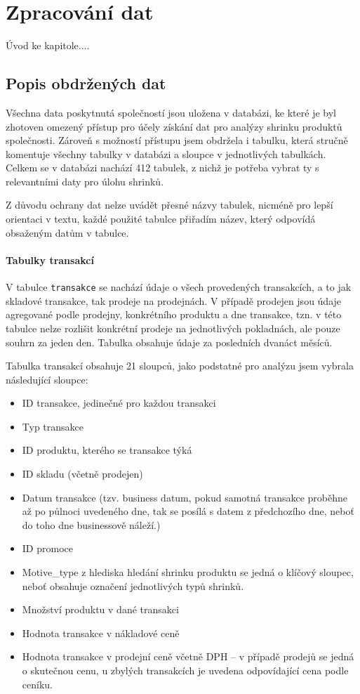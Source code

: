 \chapter{Zpracování dat}

Úvod ke kapitole.... %

\section{Popis obdržených dat}

Všechna data poskytnutá společností jsou uložena v databázi, ke které je byl zhotoven omezený přístup pro účely získání dat pro analýzy shrinku produktů společnosti. Zároveň s možností přístupu jsem obdržela i tabulku, která stručně komentuje všechny tabulky v databázi a sloupce v jednotlivých tabulkách. Celkem se v databázi nachází 412 tabulek, z nichž je potřeba vybrat ty s relevantními daty pro úlohu shrinků.

Z důvodu ochrany dat nelze uvádět přesné názvy tabulek, nicméně pro lepší orientaci v textu, každé použité tabulce přiřadím název, který odpovídá obsaženým datům v tabulce.

\subsubsection{Tabulky transakcí}
V tabulce \texttt{transakce} se nachází údaje o všech provedených transakcích, a to jak skladové transakce, tak prodeje na prodejnách. V případě prodejen jsou údaje agregované podle prodejny, konkrétního produktu a dne transakce, tzn. v této tabulce nelze rozlišit konkrétní prodeje na jednotlivých pokladnách, ale pouze souhrn za jeden den. Tabulka obsahuje údaje za posledních dvanáct měsíců.

Tabulka transakcí obsahuje 21 sloupců, jako podstatné pro analýzu jsem vybrala následující sloupce:

\begin{itemize}
    \item ID transakce, jedinečné pro každou transakci
    \item Typ transakce
    \item ID produktu, kterého se transakce týká
    \item ID skladu (včetně prodejen)
    \item Datum transakce (tzv. business datum, pokud samotná transakce proběhne až po půlnoci uvedeného dne, tak se posílá s datem z předchozího dne, neboť do toho dne businessově náleží.)
    \item ID promoce 
    \item Motive\_type z hlediska hledání shrinku produktu se jedná o klíčový sloupec, neboť obsahuje označení jednotlivých typů shrinků.
    \item Množství produktu v dané transakci
    \item Hodnota transakce v nákladové ceně
    \item Hodnota transakce v prodejní ceně včetně DPH -- v případě prodejů se jedná o skutečnou cenu, u zbylých transakcích je uvedena odpovídající cena podle ceníku.
\end{itemize}

